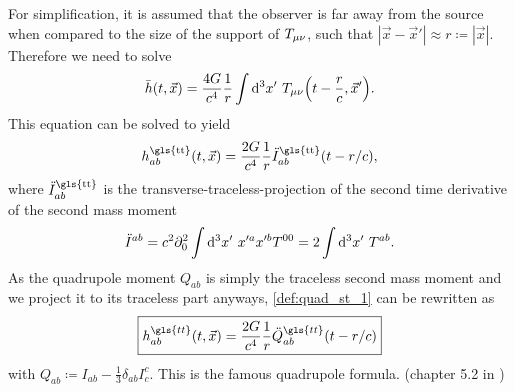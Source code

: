For simplification, it is assumed that the observer is far away from the source when compared to the size of the support of $T_{\mu\nu}$, such that $\left|\vec{x}-\vec{x}'\right|\approx r\coloneqq\left|\vec{x}\right|$. Therefore we need to solve
\begin{equation}
\bar{h}\lr{t, \vec{x}}=\frac{4 G}{c^4}\frac{1}{r}\int\Diff{3}x'\ T_\mn\lr{t-\frac{r}{c},\vec{x}'}.
\end{equation}
This equation can be solved to yield
\begin{equation}
h_{ab}^\text{\gls{tt}}\lr{t,\vec{x}}=\frac{2 G}{c^4}\frac{1}{r}\ddot{I}_{ab}^\text{\gls{tt}}\lr{t-r/c},
\end{equation}
where $\ddot{I}_{ab}^\text{\gls{tt}}$ is the transverse-traceless-projection of the second time derivative of the second mass moment
\begin{equation}\label{def:quad_st_1}
\ddot{I}^{ab}=c^2\partial_0^2 \int\mathop{}\!\mathrm{d^3}x'\ x'^a x'^b T^{00} = 2\int\mathop{}\!\mathrm{d^3}x'\ T^{ab}.
\end{equation}
As the quadrupole moment $Q_{ab}$ is simply the traceless second mass moment and we project it to its traceless part anyways, \eqref{def:quad_st_1} can be rewritten as
\begin{equation}\label{def:h_quadrupole}
\boxed{h^{\gls{tt}}_{ab}\lr{t,\vec{x}} = \frac{2 G}{c^4}\frac{1}{r}\ddot{Q}^{\gls{tt}}_{ab}\lr{t-r/c}}
\end{equation}
with $Q_{ab}\coloneqq I_{ab} - \frac{1}{3}\delta_{ab}I^c_c$. This is the famous quadrupole formula. (chapter 5.2 in \cite{bachelor})\medskip\\

